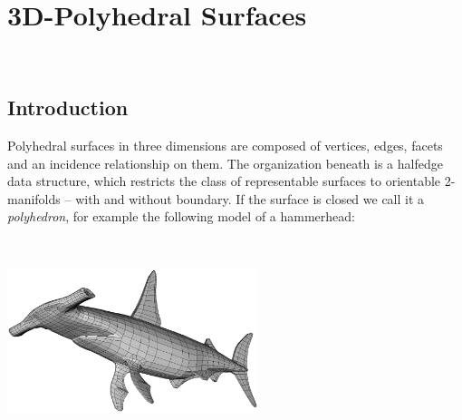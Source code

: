 
\ccParDims

\chapter{3D-Polyhedral Surfaces}
\label{chapterPolyhedron}
\\


\section{Introduction}
\label{sectionPolyIntro}

Polyhedral surfaces in three dimensions are composed of vertices,
edges, facets and an incidence relationship on them. The organization
beneath is a halfedge data structure, which restricts the class of
representable surfaces to orientable 2-manifolds -- with and without
boundary. If the surface is closed we call it a {\em polyhedron}, for
example the following model of a hammerhead:

\begin{ccTexOnly}
    \vspace*{-4mm}
    \begin{center}~\hspace{1cm}
      \parbox{0.55\textwidth}{%
          \includegraphics[width=0.55\textwidth]{fig/shark.ps}%
      }
    \end{center}
    \vspace*{-4mm}
\end{ccTexOnly}

